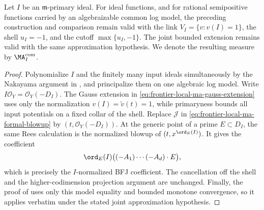 \begin{proposition}\label{prop:frontier-local-ma-reference-ideal}
Let \(I\) be an \(\mathfrak m\)-primary ideal.  For ideal functions, and for
rational semipositive functions carried by an algebraizable common log
model, the preceding construction and comparison remain valid with the link
\(V_I=\{v:v(I)=1\}\), the shell \(u_I=-1\), and the cutoff
\(\max\{u_I,-1\}\).  The joint bounded extension remains valid with the
same approximation hypothesis.  We denote the resulting measure by
\(\MA_I^{\mathrm{com}}\).
\end{proposition}

\begin{proof}
Polynomialize \(I\) and the finitely many input ideals simultaneously by the
Nakayama argument in
, and principalize them on one
algebraic log model.  Write
\(I\mathcal O_Y=\mathcal O_Y(-D_I)\).  The Gauss extension in
\eqref{eq:frontier-local-ma-gauss-extension} uses only the normalization
\(v(I)=\widetilde v(t)=1\), while primaryness bounds all input potentials on
a fixed collar of the shell.  Replace \(\mathscr J\) in
\eqref{eq:frontier-local-ma-formal-blowup} by
\((t,\mathcal O_Y(-D_I))\).  At the generic point of a prime \(E\subset
D_I\), the same Rees calculation is the normalized blowup of
\((t,x^{\ord_E(I)})\).  It gives the coefficient
\[
 \ord_E(I)\bigl((-A_1)\cdots(-A_d)\cdot E\bigr),
\]
which is precisely the \(I\)-normalized BFJ coefficient.  The cancellation
off the shell and the higher-codimension projection argument are unchanged.
Finally, the proof of
 uses only this model equality
and bounded monotone convergence, so it applies verbatim under the stated
joint approximation hypothesis.
\end{proof}

